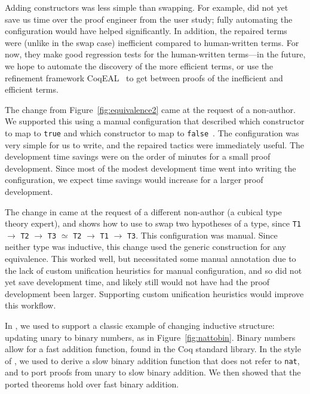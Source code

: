 Adding constructors was less simple than swapping.
For example, \toolname did not yet save us time over the proof engineer from the user study;
fully automating the configuration would have helped significantly.
In addition, the repaired terms were (unlike in the swap case) inefficient compared to human-written terms.
For now, they make good regression tests for the human-written terms---in the future,
we hope to automate the discovery of the more efficient terms,
or use the refinement framework CoqEAL~\cite{cohen:hal-01113453}
to get between proofs of the inefficient and efficient terms.

The change from Figure~\ref{fig:equivalence2} came at the request of a non-author.
We supported this using a manual configuration that described which constructor to map to \lstinline{true}
and which constructor to map to \lstinline{false}~\href{https://github.com/uwplse/pumpkin-pi/blob/v2.0.0/plugin/coq/playground/constr_refactor.v}{}.
The configuration was very simple for us to write, and the repaired tactics were immediately useful.
The development time savings were on the order of minutes for a small proof development.
Since most of the modest development time went into writing the configuration,
we expect time savings would increase for a larger proof development.

The change in \href{https://github.com/uwplse/pumpkin-pi/blob/v2.0.0/plugin/coq/playground/flip.v}{} came at the request of a different non-author (a cubical type theory expert),
and shows how to  use \toolname to swap two hypotheses of a type, since \lstinline{T1} $\rightarrow$ \lstinline{T2} $\rightarrow$ \lstinline{T3} $\simeq$
\lstinline{T2} $\rightarrow$ \lstinline{T1} $\rightarrow$ \lstinline{T3}.
This configuration was manual.
Since neither type was inductive, this change used the generic construction for any equivalence.
This worked well, but necessitated some manual annotation due to the lack of custom unification heuristics for 
manual configuration, and so did not yet save development time, and likely still would not have had the proof development been larger.
Supporting custom unification heuristics would improve this workflow.

In \href{https://github.com/uwplse/pumpkin-pi/blob/v2.0.0/plugin/coq/nonorn.v}{}, we used \toolname to support a classic example of changing inductive structure:
updating unary to binary numbers,
as in Figure~\ref{fig:nattobin}.
Binary numbers allow for a fast addition function, found in the Coq standard library.
In the style of \citet{magaud2000changing}, we used \toolname to derive a slow binary
addition function that does not refer to \lstinline{nat},
and to port proofs from unary to slow binary addition.
We then showed that the ported theorems hold over fast binary addition.

